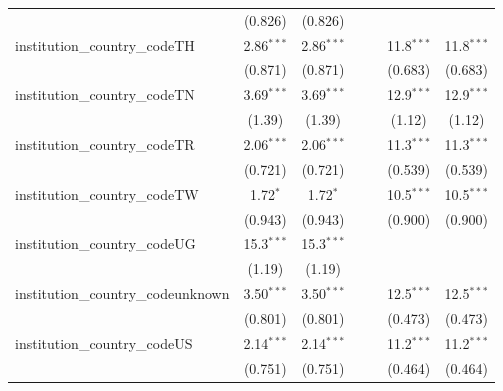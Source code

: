 \begin{tabular}{lcccccc}
                                         & (0.826)        & (0.826)        &               &               &               &   \\   
   institution\_country\_codeTH          & 2.86$^{***}$   & 2.86$^{***}$   &               &               & 11.8$^{***}$  & 11.8$^{***}$\\   
                                         & (0.871)        & (0.871)        &               &               & (0.683)       & (0.683)\\   
   institution\_country\_codeTN          & 3.69$^{***}$   & 3.69$^{***}$   &               &               & 12.9$^{***}$  & 12.9$^{***}$\\   
                                         & (1.39)         & (1.39)         &               &               & (1.12)        & (1.12)\\   
   institution\_country\_codeTR          & 2.06$^{***}$   & 2.06$^{***}$   &               &               & 11.3$^{***}$  & 11.3$^{***}$\\   
                                         & (0.721)        & (0.721)        &               &               & (0.539)       & (0.539)\\   
   institution\_country\_codeTW          & 1.72$^{*}$     & 1.72$^{*}$     &               &               & 10.5$^{***}$  & 10.5$^{***}$\\   
                                         & (0.943)        & (0.943)        &               &               & (0.900)       & (0.900)\\   
   institution\_country\_codeUG          & 15.3$^{***}$   & 15.3$^{***}$   &               &               &               &   \\   
                                         & (1.19)         & (1.19)         &               &               &               &   \\   
   institution\_country\_codeunknown     & 3.50$^{***}$   & 3.50$^{***}$   &               &               & 12.5$^{***}$  & 12.5$^{***}$\\   
                                         & (0.801)        & (0.801)        &               &               & (0.473)       & (0.473)\\   
   institution\_country\_codeUS          & 2.14$^{***}$   & 2.14$^{***}$   &               &               & 11.2$^{***}$  & 11.2$^{***}$\\   
                                         & (0.751)        & (0.751)        &               &               & (0.464)       & (0.464)\\   

\end{tabular}
